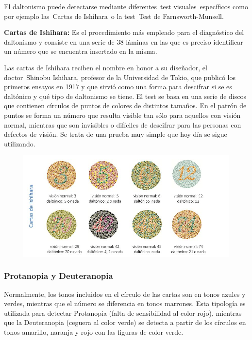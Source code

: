 \documentclass[10pt]{article}
\begin{document}
El daltonismo puede detectarse mediante diferentes test visuales específicos como por ejemplo las Cartas de Ishihara o la test Test de Farnsworth-Munsell\cite{IEEEreferencias:Ref31}.

\textbf{Cartas de Ishihara:} Es el procedimiento más empleado para el diagnóstico del daltonismo y consiste en una serie de 38 láminas en las que es preciso identificar un número que se encuentra insertado en la misma\cite{IEEEreferencias:Ref31}.

Las cartas de Ishihara reciben el nombre en honor a su diseñador, el doctor Shinobu Ishihara, profesor de la Universidad de Tokio, que publicó los primeros ensayos en 1917 y que sirvió como una forma para descifrar si se es daltónico y qué tipo de daltonismo se tiene\cite{IEEEreferencias:Ref30}.
El test se basa en una serie de discos que contienen círculos de puntos de colores de distintos tamaños. En el patrón de puntos se forma un número que resulta visible tan sólo para aquellos con visión normal, mientras que son invisibles o difíciles de descifrar para las personas con defectos de visión. Se trata de una prueba muy simple que hoy día se sigue utilizando\cite{IEEEreferencias:Ref30}.


\begin{figure}[H]
	\begin{center}
\includegraphics[scale = 0.55]{Imagenes/ishihara.jpg}
	\end{center} 
\end{figure}

\subsubsection{Protanopia y Deuteranopia}

Normalmente, los tonos incluidos en el círculo de las cartas son en tonos azules y verdes, mientras que el número se diferencia en tonos marrones. Esta tipología es utilizada para detectar Protanopia (falta de sensibilidad al color rojo), mientras que la Deuteranopia (ceguera al color verde) se detecta a partir de los círculos en tonos amarillo, naranja y rojo con las figuras de color verde\cite{IEEEreferencias:Ref30}.
\end{document}
